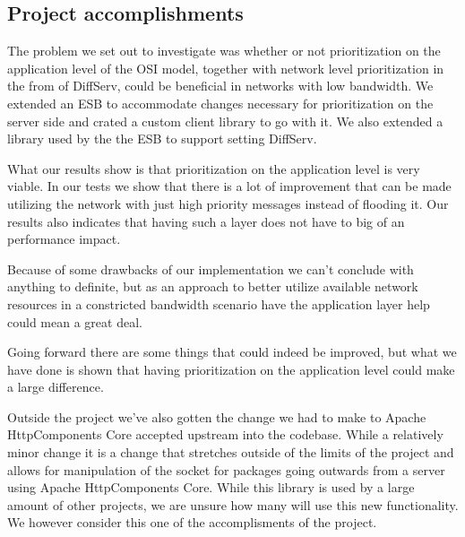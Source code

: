 \subsection{Project accomplishments}\label{Project accomplishments}
	The problem we set out to investigate was whether or not prioritization on the application level of the OSI model, together with network level prioritization in the from of DiffServ, could be beneficial in networks with low bandwidth. We extended an ESB to accommodate changes necessary for prioritization on the server side and crated a custom client library to go with it. We also extended a library used by the the ESB to support setting DiffServ.
	
	What our results show is that prioritization on the application level is very viable. In our tests we show that there is a lot of improvement that can be made utilizing the network with just high priority messages instead of flooding it. Our results also indicates that having such a layer does not have to big of an performance impact.
	
	Because of some drawbacks of our implementation we can't conclude with anything to definite, but as an approach to better utilize available network resources in a constricted bandwidth scenario have the application layer help could mean a great deal.
	
	Going forward there are some things that could indeed be improved, but what we have done is shown that having prioritization on the application level could make a large difference.

	Outside the project we've also gotten the change we had to make to Apache HttpComponents Core accepted upstream into the codebase. While a relatively minor change it is a change that stretches outside of the limits of the project and allows for manipulation of the socket for packages going outwards from a server using Apache HttpComponents Core. While this library is used by a large amount of other projects, we are unsure how many will use this new functionality. We however consider this one of the accomplisments of the project.
